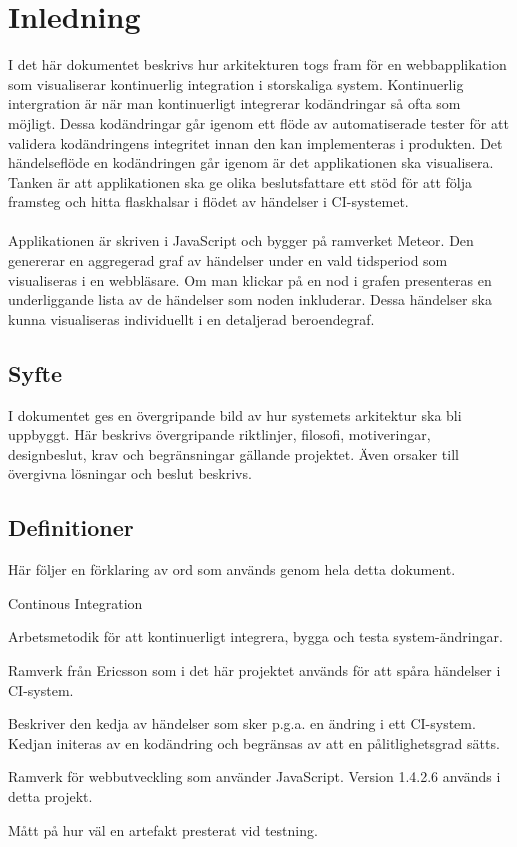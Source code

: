 \section{Inledning}
I det här dokumentet beskrivs hur arkitekturen togs fram för en webbapplikation som visualiserar kontinuerlig integration i storskaliga system. Kontinuerlig intergration är när man kontinuerligt integrerar kodändringar så ofta som möjligt. Dessa kodändringar går igenom ett flöde av automatiserade tester för att validera kodändringens integritet innan den kan implementeras i produkten. Det händelseflöde en kodändringen går igenom är det applikationen ska visualisera. Tanken är att applikationen ska ge olika beslutsfattare ett stöd för att följa framsteg och hitta flaskhalsar i flödet av händelser i CI-systemet.
\\ \\
Applikationen är skriven i JavaScript och bygger på ramverket Meteor.\cite{website:javascript}\cite{website:meteor} Den genererar en aggregerad graf av händelser under en vald tidsperiod som visualiseras i en webbläsare. Om man klickar på en nod i grafen presenteras en underliggande lista av de händelser som noden inkluderar. Dessa händelser ska kunna visualiseras individuellt i en detaljerad beroendegraf. 
\subsection{Syfte}
I dokumentet ges en övergripande bild av hur systemets arkitektur ska bli uppbyggt. Här beskrivs övergripande riktlinjer, filosofi, motiveringar, designbeslut, krav och begränsningar gällande projektet. Även orsaker till övergivna lösningar och beslut beskrivs.
\subsection{Definitioner}
Här följer en förklaring av ord som används genom hela detta dokument.
\begin{description}[leftmargin=!,labelwidth=\widthof{\bfseries Continous Integration}]
\item[CI] Continous Integration
\item[Continous Integration] Arbetsmetodik för att kontinuerligt integrera, bygga och testa system-ändringar.
\item[Eiffel] Ramverk från Ericsson som i det här projektet används för att spåra händelser i CI-system.\cite{website:eiffel}
\item[Händelseflöde] Beskriver den kedja av händelser som sker p.g.a. en ändring i ett CI-system. Kedjan initeras av en kodändring och begränsas av att en pålitlighetsgrad sätts.
\item[Meteor] Ramverk för webbutveckling som använder JavaScript. Version 1.4.2.6 används i detta projekt.\cite{website:meteor}
\item[Pålitlighetsgrad] Mått på hur väl en artefakt presterat vid testning.
\end{description}